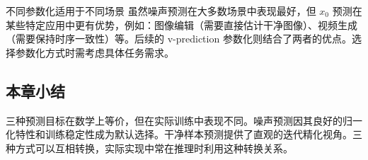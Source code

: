 \begin{warningbox}{不同参数化适用于不同场景}
虽然噪声预测在大多数场景中表现最好，但 $x_0$ 预测在某些特定应用中更有优势，例如：图像编辑（需要直接估计干净图像）、视频生成（需要保持时序一致性）等。后续的 v-prediction 参数化则结合了两者的优点。选择参数化方式时需考虑具体任务需求。
\end{warningbox}

\subsection{本章小结}

三种预测目标在数学上等价，但在实际训练中表现不同。噪声预测因其良好的归一化特性和训练稳定性成为默认选择。干净样本预测提供了直观的迭代精化视角。三种方式可以互相转换，实际实现中常在推理时利用这种转换关系。


